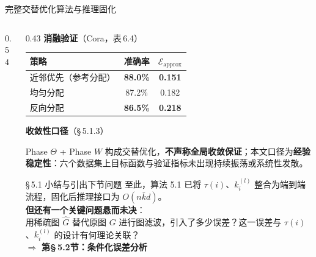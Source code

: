 \documentclass[aspectratio=169,9pt,xcolor=dvipsnames]{beamer}
\newcommand{\highlight}[1]{\textcolor{myred}{\textbf{#1}}}
\newcommand{\blue}[1]{\textcolor{mynavy}{#1}}
\newcommand{\green}[1]{\textcolor{mygreen}{#1}}
\newcommand{\kbar}{\ensuremath{\bar{k}}}
\begin{document}
\begin{frame}{完整交替优化算法与推理固化}
\begin{columns}[T]
\begin{column}{0.54\textwidth}
\end{column}

\begin{column}{0.43\textwidth}
  \textbf{\blue{消融验证}}（Cora，表\,6.4）

  \vspace{0.05cm}
  \begin{tabular}{lcc}
    \toprule
    策略 & 准确率 & $\mathcal{E}_{\mathrm{approx}}$ \\
    \midrule
    近邻优先（参考分配） & \green{\textbf{88.0\%}} & \green{\textbf{0.151}} \\
    均匀分配 & 87.2\% & 0.182 \\
    反向分配 & \highlight{86.5\%} & \highlight{0.218} \\
    \bottomrule
  \end{tabular}

  \vspace{0.15cm}
  \textbf{\blue{收敛性口径}}（§\,5.1.3）

  Phase $\Theta$ + Phase $W$ 构成交替优化，\textbf{不声称全局收敛保证}；本文口径为\textbf{经验稳定性}：六个数据集上目标函数与验证指标未出现持续振荡或系统性发散。

  \begin{alertblock}{§\,5.1 小结与引出下节问题}
    至此，算法 5.1 已将 $\tau(i)$、$k_i^{(l)}$ 整合为端到端流程，固化后推理接口为 $O(n\kbar d)$。\\[4pt]
    \textbf{但还有一个关键问题悬而未决}：\\
    用稀疏图 $\hat{G}$ 替代原图 $G$ 进行图滤波，引入了多少误差？这一误差与 $\tau(i)$、$k_i^{(l)}$ 的设计有何理论关联？\\[4pt]
    $\Rightarrow$ \textbf{第§\,5.2节：条件化误差分析}
  \end{alertblock}
\end{column}
\end{columns}
\end{frame}
\end{document}
